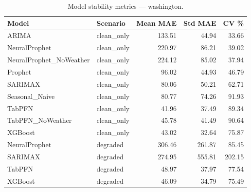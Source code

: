 \begin{table}[h]
\centering
\caption{Model stability metrics — washington.}
\label{tab:stability_washington}
\begin{tabular}{llrrr}
\toprule
Model & Scenario & Mean MAE & Std MAE & CV \% \\
\midrule
ARIMA & clean\_only & 133.51 & 44.94 & 33.66 \\
NeuralProphet & clean\_only & 220.97 & 86.21 & 39.02 \\
NeuralProphet_NoWeather & clean\_only & 224.12 & 85.02 & 37.94 \\
Prophet & clean\_only & 96.02 & 44.93 & 46.79 \\
SARIMAX & clean\_only & 80.06 & 50.21 & 62.71 \\
Seasonal_Naive & clean\_only & 80.77 & 74.26 & 91.93 \\
TabPFN & clean\_only & 41.96 & 37.49 & 89.34 \\
TabPFN_NoWeather & clean\_only & 45.78 & 41.49 & 90.64 \\
XGBoost & clean\_only & 43.02 & 32.64 & 75.87 \\
NeuralProphet & degraded & 306.46 & 261.87 & 85.45 \\
SARIMAX & degraded & 274.95 & 555.81 & 202.15 \\
TabPFN & degraded & 48.97 & 37.97 & 77.54 \\
XGBoost & degraded & 46.09 & 34.79 & 75.49 \\
\bottomrule
\end{tabular}
\end{table}
